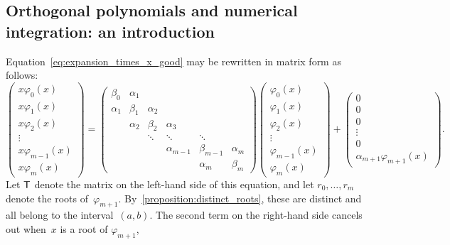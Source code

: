 \subsection{Orthogonal polynomials and numerical integration: an introduction~\moreinfo}
\label{sub:orthogonal_integration}
Equation~\eqref{eq:expansion_times_x_good} may be rewritten in matrix form as follows:
\[
    \begin{pmatrix}
        x \varphi_0(x) \\
        x \varphi_1(x) \\
        x \varphi_2(x) \\
        \vdots \\
        x \varphi_{m-1}(x) \\
        x \varphi_m(x)
    \end{pmatrix}
    =
    \begin{pmatrix}
        \beta_0 & \alpha_1 \\
        \alpha_1 & \beta_1 & \alpha_2 \\
                 & \alpha_2 & \beta_2 & \alpha_3 \\
                 & & \ddots & \ddots & \ddots \\
                 & & & \alpha_{m-1} & \beta_{m-1} & \alpha_m \\
                 & & & & \alpha_m & \beta_m
    \end{pmatrix}
    \begin{pmatrix}
        \varphi_0(x) \\
        \varphi_1(x) \\
        \varphi_2(x) \\
        \vdots \\
        \varphi_{m-1}(x) \\
        \varphi_m(x)
    \end{pmatrix}
    +
    \begin{pmatrix}
        0 \\
        0 \\
        0 \\
        \vdots \\
        0 \\
        \alpha_{m+1} \varphi_{m+1}(x)
    \end{pmatrix}.
\]
Let $\mathsf T$ denote the matrix on the left-hand side of this equation,
and let $r_0, \dotsc, r_{m}$ denote the roots of~$\varphi_{m+1}$.
By~\cref{proposition:distinct_roots},
these are distinct and all belong to the interval~$(a, b)$.
The second term on the right-hand side cancels out when~$x$ is a root of $\varphi_{m+1}$,
